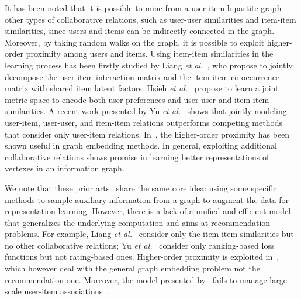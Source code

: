 \documentclass[sigconf,anonymous=false]{acmart}
\begin{document}
It has been noted that it is possible to mine from a user-item bipartite graph
other types of collaborative relations, such as user-user similarities and
item-item similarities, since users and items can be indirectly connected in
the graph.
Moreover, by taking random walks on the graph, it is possible to exploit
higher-order proximity among users and items.
Using item-item similarities in the learning process has been firstly
studied by Liang \emph{et al.}~\cite{cofactor}, who propose to jointly
decompose the user-item interaction matrix and the item-item co-occurrence
matrix with shared item latent factors.
Hsieh \emph{et al.}~\cite{cml} propose to learn a joint metric space to encode
both user preferences and user-user and item-item similarities.
A recent work presented by Yu \emph{et al.}~\cite{walkranker} shows that
jointly modeling user-item, user-user, and item-item relations outperforms
competing methods that consider only user-item relations.
In~\cite{n2v,dw}, the higher-order proximity has been shown useful in graph
embedding methods.
In general, exploiting additional collaborative relations shows promise in
learning better representations of vertexes in an information graph.

We note that these prior arts~\cite{cofactor,cml,walkranker,n2v} share the
same core idea: using some specific methods to sample auxiliary information
from a graph to augment the data for representation learning.
However, there is a lack of a unified and efficient model that generalizes the
underlying computation and aims at recommendation problems.
For example, Liang \emph{et al.}~\cite{cofactor} consider only the item-item
similarities but no other collaborative relations; Yu \emph{et
al.}~\cite{walkranker} consider only ranking-based loss functions but not
rating-based ones.
Higher-order proximity is exploited in~\cite{dw,n2v,bine}, which however deal with
the general graph embedding problem not the recommendation one.
Moreover, the model presented by~\cite{cml} fails to manage large-scale
user-item associations~\cite{lrml}.
\end{document}
